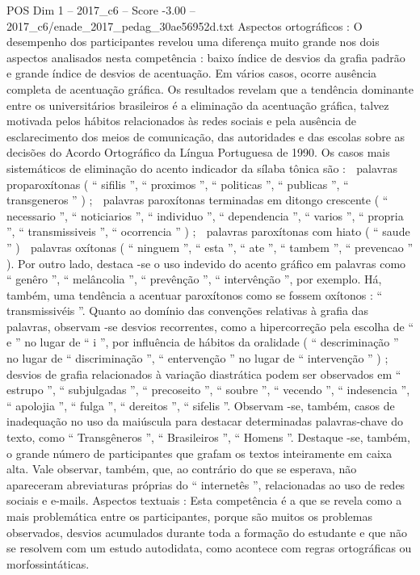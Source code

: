 \begin{textsample}{POS Dim 1 – 2017\_c6 – Score -3.00 – 2017\_c6/enade\_2017\_pedag\_30ae56952d.txt}
Aspectos ortográficos : O desempenho dos participantes revelou uma diferença muito grande nos dois aspectos analisados nesta competência : baixo índice de desvios da grafia padrão e grande índice de desvios de acentuação.
Em vários casos, ocorre ausência completa de acentuação gráfica.
Os resultados revelam que a tendência dominante entre os universitários brasileiros é a eliminação da acentuação gráfica, talvez motivada pelos hábitos relacionados às redes sociais e pela ausência de esclarecimento dos meios de comunicação, das autoridades e das escolas sobre as decisões do Acordo Ortográfico da Língua Portuguesa de 1990.
Os casos mais sistemáticos de eliminação do acento indicador da sílaba tônica são :  palavras proparoxítonas ( “ sifilis ”, “ proximos ”, “ politicas ”, “ publicas ”, “ transgeneros ” ) ;  palavras paroxítonas terminadas em ditongo crescente ( “ necessario ”, “ noticiarios ”, “ individuo ”, “ dependencia ”, “ varios ”, “ propria ”, “ transmissiveis ”, “ ocorrencia ” ) ;  palavras paroxítonas com hiato ( “ saude ” )  palavras oxítonas ( “ ninguem ”, “ esta ”, “ ate ”, “ tambem ”, “ prevencao ” ).
Por outro lado, destaca -se o uso indevido do acento gráfico em palavras como “ genêro ”, “ melâncolia ”, “ prevênção ”, “ intervênção ”, por exemplo.
Há, também, uma tendência a acentuar paroxítonos como se fossem oxítonos : “ transmissivéis ”.
Quanto ao domínio das convenções relativas à grafia das palavras, observam -se desvios recorrentes, como a hipercorreção pela escolha de “ e ” no lugar de “ i ”, por influência de hábitos da oralidade ( “ descriminação ” no lugar de “ discriminação ”, “ entervenção ” no lugar de “ intervenção ” ) ; desvios de grafia relacionados à variação diastrática podem ser observados em “ estrupo ”, “ subjulgadas ”, “ precoseito ”, “ soubre ”, “ vecendo ”, “ indesencia ”, “ apolojia ”, “ fulga ”, “ dereitos ”, “ sifelis ”.
Observam -se, também, casos de inadequação no uso da maiúscula para destacar determinadas palavras-chave do texto, como “ Transgêneros ”, “ Brasileiros ”, “ Homens ”.
Destaque -se, também, o grande número de participantes que grafam os textos inteiramente em caixa alta.
Vale observar, também, que, ao contrário do que se esperava, não apareceram abreviaturas próprias do “ internetês ”, relacionadas ao uso de redes sociais e e-mails.
Aspectos textuais : Esta competência é a que se revela como a mais problemática entre os participantes, porque são muitos os problemas observados, desvios acumulados durante toda a formação do estudante e que não se resolvem com um estudo autodidata, como acontece com regras ortográficas ou morfossintáticas.

\end{textsample}
